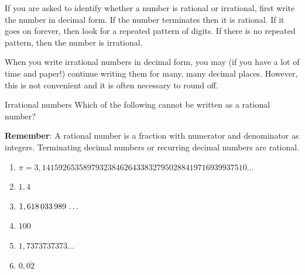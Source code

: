 If you are asked to identify whether a number is rational or irrational, first write the number in decimal form. If the number terminates then it is rational. If it goes on forever, then look for a repeated pattern of digits. If there is no repeated pattern, then the number is irrational.\par 
When you write irrational numbers in decimal form, you may (if you have a lot of time and paper!) continue writing them for many, many decimal places. However, this is not convenient and it is often necessary to round off.\par 



\begin{activity}{Irrational numbers }
\nopagebreak
Which of the following cannot be
written as a rational number?\par \vspace{0.5cm}
\textbf{Remember}: A rational number is a fraction with numerator and denominator as integers. Terminating decimal numbers or recurring decimal numbers are rational.\par 
\begin{enumerate}[itemsep=5pt, label=\textbf{\arabic*}. ] 
\item $\pi =3,14159265358979323846264338327950288419716939937510\ldots$
\item $1,4$
\item $1,618\phantom{\rule{0.166667em}{0ex}}033\phantom{\rule{0.166667em}{0ex}}989\phantom{\rule{0.166667em}{0ex}}\ldots$
\item $100$
\item $1,7373737373\ldots$
\item $0,\overline{02}$
\end{enumerate}
\end{activity}


